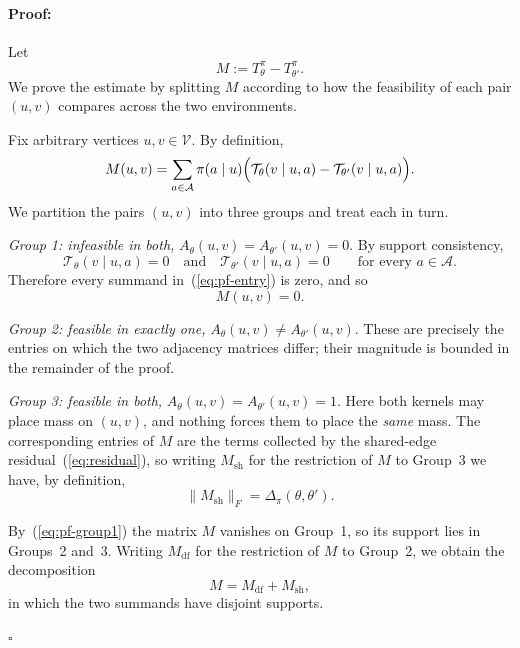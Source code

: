 \documentclass[twoside]{article}
\renewenvironment{proof}{\paragraph{Proof:}}{\hfill$\square$}
\begin{document}
\begin{proof}
Let
\[
    M := T^\pi_\theta - T^\pi_{\theta'}.
\]
We prove the estimate by splitting $M$ according to how the feasibility
of each pair $(u,v)$ compares across the two environments.

Fix arbitrary vertices $u,v\in\mathcal V$. By definition,
\begin{equation}\label{eq:pf-entry}
    M(u,v)
    =
    \sum_{a\in\mathcal A}
    \pi(a\mid u)
    \Bigl(
        \mathcal T_\theta(v\mid u,a)
        -
        \mathcal T_{\theta'}(v\mid u,a)
    \Bigr).
\end{equation}
We partition the pairs $(u,v)$ into three groups and treat each in turn.

\emph{Group 1: infeasible in both,} $A_\theta(u,v)=A_{\theta'}(u,v)=0$.
By support consistency,
\[
    \mathcal T_\theta(v\mid u,a)=0
    \quad\text{and}\quad
    \mathcal T_{\theta'}(v\mid u,a)=0
    \qquad
    \text{for every } a\in\mathcal A.
\]
Therefore every summand in~(\ref{eq:pf-entry}) is zero, and so
\begin{equation}\label{eq:pf-group1}
    M(u,v)=0 .
\end{equation}

\emph{Group 2: feasible in exactly one,} $A_\theta(u,v)\neq A_{\theta'}(u,v)$.
These are precisely the entries on which the two adjacency matrices
differ; their magnitude is bounded in the remainder of the proof.

\emph{Group 3: feasible in both,} $A_\theta(u,v)=A_{\theta'}(u,v)=1$.
Here both kernels may place mass on $(u,v)$, and nothing forces them to
place the \emph{same} mass. The corresponding entries of $M$ are
the terms collected by the shared-edge residual~(\ref{eq:residual}), so
writing $M_{\mathrm{sh}}$ for the restriction of $M$ to Group~3 we have,
by definition,
\begin{equation}\label{eq:pf-group3}
    \|M_{\mathrm{sh}}\|_F = \Delta_\pi(\theta,\theta') .
\end{equation}

By~(\ref{eq:pf-group1}) the matrix $M$ vanishes on Group~1, so its
support lies in Groups~2 and~3. Writing $M_{\mathrm{df}}$ for the
restriction of $M$ to Group~2, we obtain the decomposition
\begin{equation}\label{eq:pf-split}
    M = M_{\mathrm{df}} + M_{\mathrm{sh}},
\end{equation}
in which the two summands have disjoint supports.


\end{proof}
\end{document}
